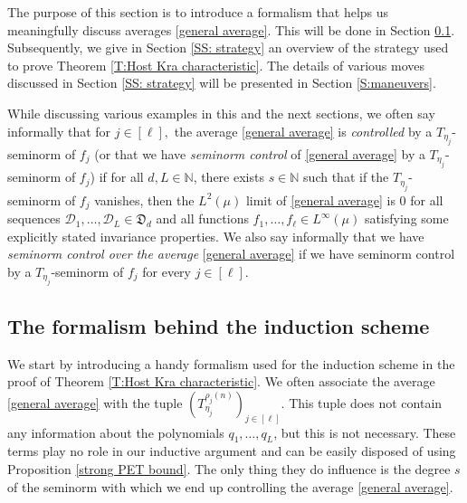 \documentclass[11pt]{amsart}
\theoremstyle{definition}
\newcommand{\N}{{\mathbb N}}
\newcommand{\CD}{{\mathcal D}}
\newcommand{\FD}{{\mathfrak D}}
\newcommand{\brac}[1]{\mathopen{}\left( #1 \mathclose{}\right)}
\begin{document}
The purpose of this section is to introduce a formalism that helps us meaningfully discuss averages \eqref{general average}. This will be done in Section \ref{SS:formalism}. Subsequently, we give in Section \ref{SS: strategy} an overview of the strategy used to prove Theorem \ref{T:Host Kra characteristic}. The details of various moves discussed in Section \ref{SS: strategy} will be presented in Section \ref{S:maneuvers}.


While discussing various examples in this and the next sections, we often say informally that for $j\in[\ell],$ the average \eqref{general average} is \textit{controlled} by a $T_{\eta_j}$-seminorm of $f_j$ (or that we have \textit{seminorm control} of \eqref{general average} by a $T_{\eta_j}$-seminorm of $f_j$) if for all $d, L\in\N$, there exists $s\in\N$ such that if the $T_{\eta_j}$-seminorm of $f_j$ vanishes, then  the $L^2(\mu)$ limit of \eqref{general average} is 0 for all sequences $\CD_1, \ldots, \CD_L\in\FD_d$ and all functions $f_1, \ldots, f_\ell\in L^\infty(\mu)$ satisfying some explicitly stated invariance properties. We also say informally that we have \textit{seminorm control over the average} \eqref{general average} if we have seminorm control by a $T_{\eta_j}$-seminorm of $f_j$ for every $j\in[\ell]$.


\subsection{The formalism behind the induction scheme}\label{SS:formalism}
We start by introducing a handy formalism used for the induction scheme in the proof of Theorem \ref{T:Host Kra characteristic}. We often associate the average \eqref{general average} with the tuple $\brac{T_{\eta_j}^{\rho_j(n)}}_{j\in[\ell]}$. This tuple does not contain any information about the polynomials $q_1, \ldots, q_L$, but this is not necessary. These terms play no role in our inductive argument and can be easily disposed of using Proposition \ref{strong PET bound}. The only thing they do influence is the degree $s$ of the seminorm with which we end up controlling the average \eqref{general average}.
\end{document}

